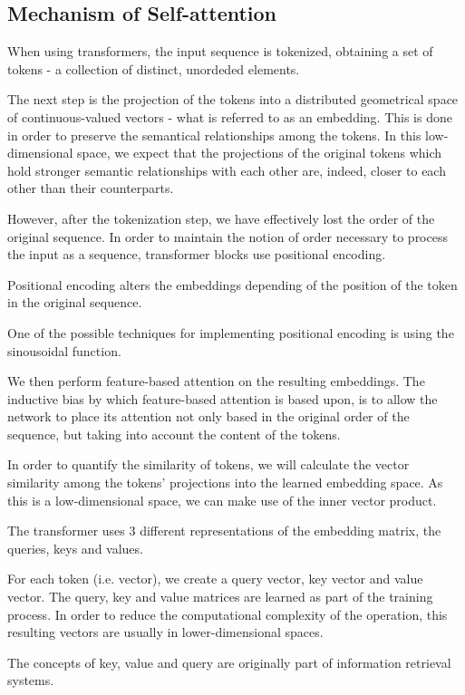 \subsection{Mechanism of Self-attention}
\label{self-attention}

When using transformers, the input sequence is tokenized, obtaining a set of tokens - a collection of distinct, unordeded elements.


The next step is the projection of the tokens into a distributed geometrical space of continuous-valued vectors - what is referred to as an embedding. This is done in order to preserve the semantical relationships among the tokens.
In this low-dimensional space, we expect that the projections of the original tokens which hold stronger semantic relationships with each other are, indeed, closer to each other than their counterparts.


However, after the tokenization step, we have effectively lost the order of the original sequence. In order to maintain the notion of order necessary to process the input as a sequence,
transformer blocks use positional encoding.

Positional encoding alters the embeddings depending of the position of the token in the original sequence.

One of the possible techniques for implementing positional encoding is using the sinousoidal function. 

We then perform feature-based attention on the resulting embeddings.
The inductive bias by which feature-based attention is based upon, is to allow the network to place its attention not only based
in the original order of the sequence, but taking into account the content of the tokens.

In order to quantify the similarity of tokens, we will calculate the vector similarity among the tokens' projections
into the learned embedding space. As this is a low-dimensional space, we can make use of the inner vector product.

The transformer uses 3 different representations of the embedding matrix, the queries, keys and values.

For each token (i.e. vector), we create a query vector, key vector and value vector. The query, key and value matrices are
learned as part of the training process.
In order to reduce the computational complexity of the operation, this resulting vectors are usually in lower-dimensional spaces.

The concepts of key, value and query are originally part of information retrieval systems.


